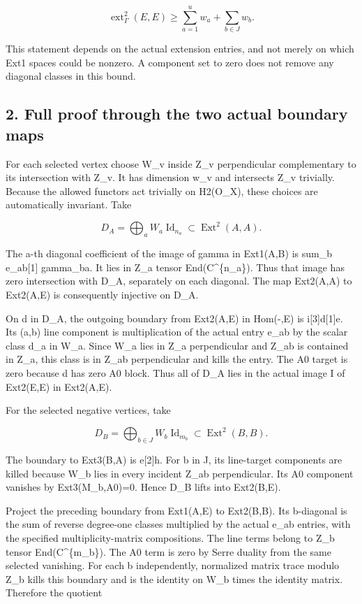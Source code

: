 \[
 \operatorname{ext}^2_\Gamma(E,E)
      \ge\sum_{a=1}^u w_a+\sum_{b\in J}w_b.
 \tag{E831.3}
\]

This statement depends on the actual extension entries, and not merely on
which Ext1 spaces could be nonzero. A component set to zero does not remove
any diagonal classes in this bound.

\subsection{2. Full proof through the two actual boundary
maps}\label{SF-E831:full-proof-through-the-two-actual-boundary-maps}

For each selected vertex choose W\_v inside Z\_v perpendicular complementary
to its intersection with Z\_v. It has dimension w\_v and intersects Z\_v
trivially. Because the allowed functors act trivially on H2(O\_X), these
choices are automatically invariant. Take

\[
 D_A=\bigoplus_a W_a\operatorname{Id}_{n_a}
           \subset\operatorname{Ext}^2(A,A).
 \tag{E831.4}
\]

The a-th diagonal coefficient of the image of gamma in Ext1(A,B) is sum\_b
e\_ab{[}1{]} gamma\_ba. It lies in Z\_a tensor End(C\^{}\{n\_a\}). Thus that
image has zero intersection with D\_A, separately on each diagonal. The map
Ext2(A,A) to Ext2(A,E) is consequently injective on D\_A.

On d in D\_A, the outgoing boundary from Ext2(A,E) in Hom(-,E) is
i{[}3{]}d{[}1{]}e. Its (a,b) line component is multiplication of the actual
entry e\_ab by the scalar class d\_a in W\_a. Since W\_a lies in Z\_a
perpendicular and Z\_ab is contained in Z\_a, this class is in Z\_ab
perpendicular and kills the entry. The A0 target is zero because d has zero
A0 block. Thus all of D\_A lies in the actual image I of Ext2(E,E) in
Ext2(A,E).

For the selected negative vertices, take

\[
 D_B=\bigoplus_{b\in J}W_b\operatorname{Id}_{m_b}
           \subset\operatorname{Ext}^2(B,B).
 \tag{E831.5}
\]

The boundary to Ext3(B,A) is e{[}2{]}h. For b in J, its line-target
components are killed because W\_b lies in every incident Z\_ab
perpendicular. Its A0 component vanishes by Ext3(M\_b,A0)=0. Hence D\_B
lifts into Ext2(B,E).

Project the preceding boundary from Ext1(A,E) to Ext2(B,B). Its b-diagonal
is the sum of reverse degree-one classes multiplied by the actual e\_ab
entries, with the specified multiplicity-matrix compositions. The line terms
belong to Z\_b tensor End(C\^{}\{m\_b\}). The A0 term is zero by Serre
duality from the same selected vanishing. For each b independently,
normalized matrix trace modulo Z\_b kills this boundary and is the identity
on W\_b times the identity matrix. Therefore the quotient

